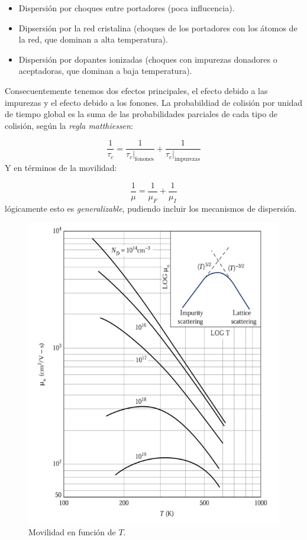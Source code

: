 \begin{itemize}
	\item Dispersión por choques entre portadores (poca influcencia).
	\item Dipsersión por la red cristalina (choques de los portadores con los átomos de la red, que dominan a alta temperatura).
	\item Dispersión por dopantes ionizadas (choques con impurezas donadores o aceptadoras, que dominan a baja temperatura).
\end{itemize}
Consecuentemente tenemos dos efectos principales, el efecto debido a las impurezas y el efecto debido a los fonones. La probabildiad de colisión por unidad de tiempo global es la suma de las probabilidades parciales de cada tipo de colisión, según la \textit{regla matthiessen}:

\begin{equation}
	\frac{1}{\tau_c} = \frac{1}{\tau_c|_{\text{fonones}}}+\frac{1}{\tau_c|_{\text{impurezas}}}
\end{equation}
Y en términos de la movilidad:

\begin{equation}
	\frac{1}{\mu}=\frac{1}{\mu_F}+\frac{1}{\mu_I}
\end{equation}
lógicamente esto es \textit{generalizable}, pudiendo incluir los mecanismos de dispersión.

\begin{figure}[h!] \centering
	\includegraphics[width=0.6\linewidth]{Cuerpo/Ch_02/02_Movilidad.png}
	\caption{Movilidad en función de $T$.}
	\label{Fig:02-02}
\end{figure}

